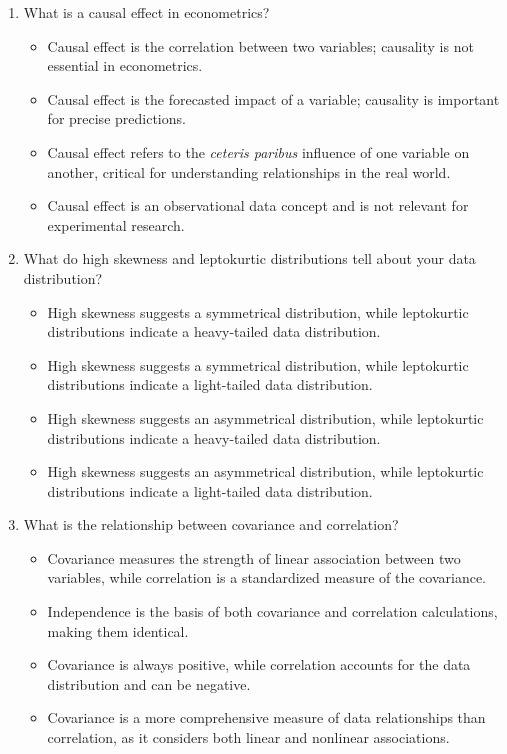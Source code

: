 \documentclass{article}
\begin{document}
\begin{enumerate}
\newpage
\item What is a causal effect in econometrics?
  \begin{itemize}
  \item[A.] Causal effect is the correlation between two variables; causality is not essential in econometrics.
  \item[B.] Causal effect is the forecasted impact of a variable; causality is important for precise predictions.
  \item[C.] Causal effect refers to the \textit{ceteris paribus} influence of one variable on another, critical for understanding relationships in the real world.
  \item[D.] Causal effect is an observational data concept and is not relevant for experimental research.
  \end{itemize}

\item What do high skewness and leptokurtic distributions tell about your data distribution?
  \begin{itemize}
  \item[A.] High skewness suggests a symmetrical distribution, while leptokurtic distributions indicate a heavy-tailed data distribution.
  \item[B.] High skewness suggests a symmetrical distribution, while leptokurtic distributions indicate a light-tailed data distribution.
  \item[C.] High skewness suggests an asymmetrical distribution, while leptokurtic distributions indicate a heavy-tailed data distribution.
  \item[D.] High skewness suggests an asymmetrical distribution, while leptokurtic distributions indicate a light-tailed data distribution.
  \end{itemize}

\item What is the relationship between covariance and correlation?
  \begin{itemize}
  \item[A.] Covariance measures the strength of linear association between two variables, while correlation is a standardized measure of the covariance.
  \item[B.] Independence is the basis of both covariance and correlation calculations, making them identical.
  \item[C.] Covariance is always positive, while correlation accounts for the data distribution and can be negative.
  \item[D.] Covariance is a more comprehensive measure of data relationships than correlation, as it considers both linear and nonlinear associations.
  \end{itemize}


\end{enumerate}
\end{document}
